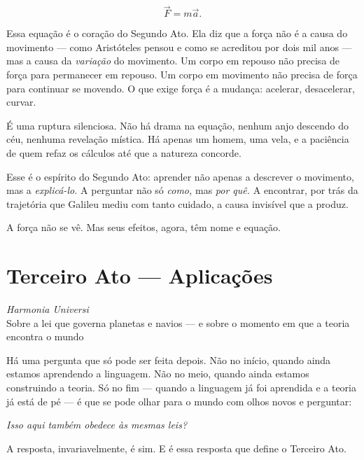 \begin{equation*}
    \vec{F} = m\vec{a}.
\end{equation*}

Essa equação é o coração do Segundo Ato. Ela diz que a força não é
a causa do movimento --- como Aristóteles pensou e como se acreditou por dois mil
anos --- mas a causa da \textit{variação} do movimento. Um corpo em
repouso não precisa de força para permanecer em repouso. Um corpo em
movimento não precisa de força para continuar se movendo. O que
exige força é a mudança: acelerar, desacelerar, curvar.

É uma ruptura silenciosa. Não há drama na equação, nenhum anjo
descendo do céu, nenhuma revelação mística. Há apenas um homem, uma
vela, e a paciência de quem refaz os cálculos até que a natureza
concorde.

Esse é o espírito do Segundo Ato: aprender não apenas a descrever o
movimento, mas a \textit{explicá-lo.} A perguntar não só \textit{como,}
mas \textit{por quê.} A encontrar, por trás da trajetória que Galileu
mediu com tanto cuidado, a causa invisível que a produz.

A força não se vê. Mas seus efeitos, agora, têm nome e equação.




\section*{Terceiro Ato --- Aplicações}
\begin{center}
    \textit{Harmonia Universi} \\[0.2cm]
    {\small Sobre a lei que governa planetas e navios --- e sobre o momento
    em que a teoria encontra o mundo}
\end{center}

\bigskip

Há uma pergunta que só pode ser feita depois. Não no início, quando ainda estamos aprendendo a linguagem. Não no
meio, quando ainda estamos construindo a teoria. Só no fim --- quando
a linguagem já foi aprendida e a teoria já está de pé --- é que se
pode olhar para o mundo com olhos novos e perguntar:

\begin{center}
    \textit{Isso aqui também obedece às mesmas leis?}
\end{center}

A resposta, invariavelmente, é sim. E é essa resposta que define o
Terceiro Ato.

